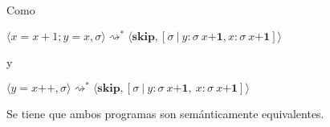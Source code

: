 \documentclass[12pt, titlepage]{article}
\renewcommand{\skip}{\textbf{skip}}
\newcommand{\lbangle}{\bm{\langle}}
\newcommand{\rbangle}{\bm{\rangle}}
\newcommand{\deriva}{\rightsquigarrow}
\newcommand{\pp}{\texttt{++}}
\begin{document}
Como

$\lbangle x=x+1;y=x, \sigma \rbangle \deriva^{*} \lbangle \skip, [\sigma \ | \  y: \sigma \  x \bm{+} \bm{1}, x:\sigma \  x \bm{+} \bm{1}]\rbangle$

\hspace{0.5cm}y

$\lbangle y=x\pp, \sigma \rbangle \deriva^{*} \lbangle \skip, [\sigma \ | \ y: \sigma \ x \bm{+} \bm{1}, \: x:\sigma \ x \bm{+} \bm{1}] \rbangle$

Se tiene que ambos programas son semánticamente equivalentes.
\end{document}
